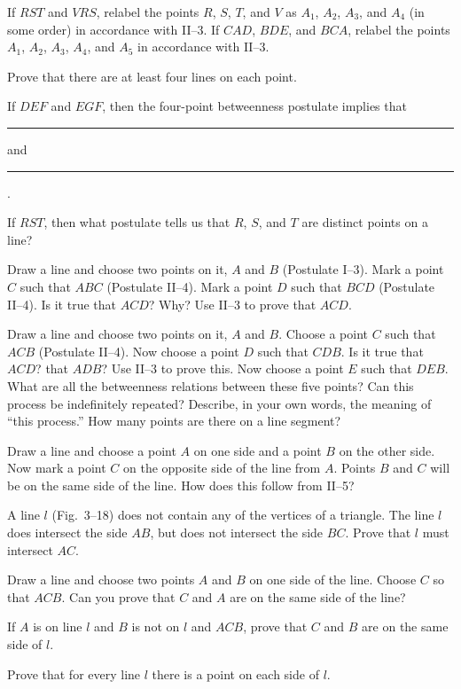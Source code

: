 \documentclass[11pt]{book}
\theoremstyle{bkplain}
\theoremstyle{XIplainnote}
\theoremstyle{bkplain}
\theoremstyle{bkplain}
\begin{document}
\begin{exercisecols}
\begin{exlist}[start=8]
\item If $RST$ and $VRS$, relabel the points $R$, $S$, $T$, and $V$ as $A_1$,
      $A_2$, $A_3$, and $A_4$ (in some order) in accordance with II--3. If
      $CAD$, $BDE$, and $BCA$, relabel the points $A_1$, $A_2$, $A_3$, $A_4$, and
      $A_5$ in accordance with II--3.
\item Prove that there are at least four lines on each point.
\item If $DEF$ and $EGF$, then the four-point betweenness postulate implies that
      \rule{2.2em}{0.4pt} and \rule{2.6em}{0.4pt}.
\item If $RST$, then what postulate tells us that $R$, $S$, and $T$ are distinct
      points on a line?
\item[\stex 12.] Draw a line and choose two points on it, $A$ and $B$ (Postulate
      I--3). Mark a point $C$ such that $ABC$ (Postulate II--4). Mark a point $D$
      such that $BCD$ (Postulate II--4). Is it true that $ACD$? Why? Use II--3 to
      prove that $ACD$.
\item[\stex 13.] Draw a line and choose two points on it, $A$ and $B$. Choose a
      point $C$ such that $ACB$ (Postulate II--4). Now choose a point $D$ such
      that $CDB$. Is it true that $ACD$? that $ADB$? Use II--3 to prove this.
      Now choose a point $E$ such that $DEB$. What are all the betweenness
      relations between these five points? Can this process be indefinitely
      repeated? Describe, in your own words, the meaning of ``this process.'' How
      many points are there on a line segment?
\item[\stex 14.] Draw a line and choose a point $A$ on one side and a point $B$ on
      the other side. Now mark a point $C$ on the opposite side of the line from
      $A$. Points $B$ and $C$ will be on the same side of the line. How does this
      follow from II--5?
\item[\stex 15.] A line $l$ (Fig.~3--18) does not contain any of the vertices of
      a triangle. The line $l$ does intersect the side $AB$, but does not
      intersect the side $BC$. Prove that $l$ must intersect $AC$.
\exfig{\FIGIIIEIGHTEEN}
\item[\stex 16.] Draw a line and choose two points $A$ and $B$ on one side of the
      line. Choose $C$ so that $ACB$. Can you prove that $C$ and $A$ are on the
      same side of the line?
\item[\stex 17.] If $A$ is on line $l$ and $B$ is not on $l$ and $ACB$, prove
      that $C$ and $B$ are on the same side of $l$.
\item[\stex 18.] Prove that for every line $l$ there is a point on each side of
      $l$.
\end{exlist}
\end{exercisecols}
\end{document}
